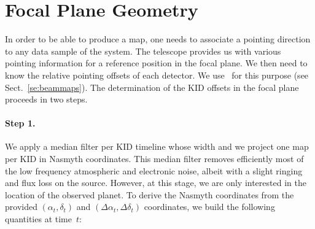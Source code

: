 %
%
%

\section{Focal Plane Geometry}%
\label{se:fov_geometry}



In order to be able to produce a map, one needs to associate a pointing
direction to any data sample of the system. The telescope provides us with
various pointing information for a reference position in the focal plane. We
then need to know the relative pointing offsets of each detector. We use
\bms\ for this purpose (see Sect.~\ref{se:beammaps}). The determination of the
KID offsets in the focal plane proceeds in two steps.

\paragraph{Step 1.} We apply a median filter per
KID timeline whose width  and we project one map per KID in Nasmyth
coordinates. This median filter removes
efficiently most of the low frequency atmospheric and electronic
noise, albeit with a slight ringing and flux loss on the
source. However, at this stage, we are only interested in the location
of the observed planet. To derive the Nasmyth coordinates from the
provided $(\alpha_t,\delta_t)$ and $(\Delta\alpha_t,\Delta\delta_t)$
coordinates, we build the following quantities at time~$t$:

